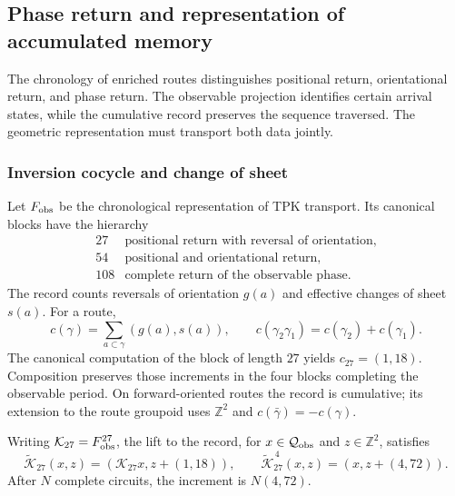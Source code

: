 
\subsection{Phase return and representation of accumulated memory}
\label{vii:sec:retorno-memoria-gravedad}

The chronology of enriched routes distinguishes positional return,
orientational return, and phase return. The observable projection
identifies certain arrival states, while the cumulative record
preserves the sequence traversed. The geometric representation must
transport both data jointly.

\subsubsection{Inversion cocycle and change of sheet}
\label{vii:subsec:cociclo-memoria}

Let \(F_{\rm obs}\) be the chronological representation of TPK transport.
Its canonical blocks have the hierarchy
\[
\begin{array}{c|l}
27&\text{positional return with reversal of orientation},\\
54&\text{positional and orientational return},\\
108&\text{complete return of the observable phase}.
\end{array}
\]
The record counts reversals of orientation \(g(a)\) and
effective changes of sheet \(s(a)\). For a route,
\begin{equation}
 c(\gamma)=\sum_{a\subset\gamma}(g(a),s(a)),\qquad
 c(\gamma_2\gamma_1)=c(\gamma_2)+c(\gamma_1).
 \label{vii:eq:cociclo-ruta}
\end{equation}
The canonical computation of the block of length \(27\) yields
\(c_{27}=(1,18)\). Composition preserves those increments in
the four blocks completing the observable period.
On forward-oriented routes the record is cumulative;
its extension to the route groupoid uses \(\mathbb Z^2\) and
\(c(\bar\gamma)=-c(\gamma)\).

\begin{proposition}
\label{vii:prop:memoria-vuelta-completa}
Writing \(\mathcal K_{27}=F_{\rm obs}^{27}\), the lift
to the record, for \(x\in\mathcal Q_{\rm obs}\) and \(z\in\mathbb Z^2\), satisfies
\[
 \widetilde{\mathcal K}_{27}(x,z)
   =(\mathcal K_{27}x,z+(1,18)),\qquad
 \widetilde{\mathcal K}_{27}^{\,4}(x,z)
   =(x,z+(4,72)).
\]
After \(N\) complete circuits, the increment is \(N(4,72)\).
\end{proposition}


